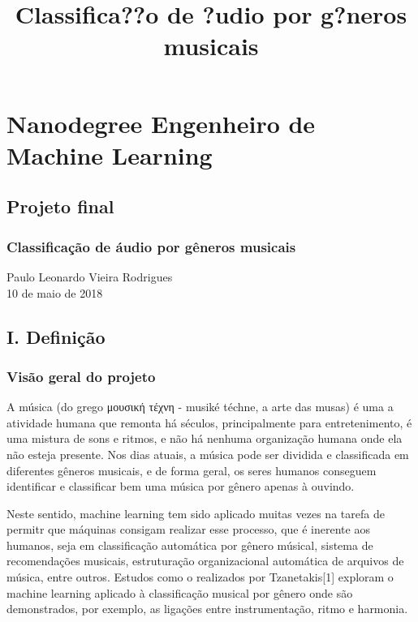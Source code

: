 \documentclass[11pt]{article}
\title{Classifica??o de ?udio por g?neros musicais}
\begin{document}
    
    
    \maketitle
    
    

    
    \section{Nanodegree Engenheiro de Machine
Learning}\label{nanodegree-engenheiro-de-machine-learning}

\subsection{Projeto final}\label{projeto-final}

\subsubsection{Classificação de áudio por gêneros
musicais}\label{classificauxe7uxe3o-de-uxe1udio-por-guxeaneros-musicais}

Paulo Leonardo Vieira Rodrigues\\
10 de maio de 2018

    \subsection{I. Definição}\label{i.-definiuxe7uxe3o}

\subsubsection{Visão geral do projeto}\label{visuxe3o-geral-do-projeto}

A música (do grego μουσική τέχνη - musiké téchne, a arte das musas) é
uma a atividade humana que remonta há séculos, principalmente para
entretenimento, é uma mistura de sons e ritmos, e não há nenhuma
organização humana onde ela não esteja presente. Nos dias atuais, a
música pode ser dividida e classificada em diferentes gêneros musicais,
e de forma geral, os seres humanos conseguem identificar e classificar
bem uma música por gênero apenas à ouvindo.

Neste sentido, machine learning tem sido aplicado muitas vezes na tarefa
de permitr que máquinas consigam realizar esse processo, que é inerente
aos humanos, seja em classificação automática por gênero músical,
sistema de recomendações musicais, estruturação organizacional
automática de arquivos de música, entre outros. Estudos como o
realizados por Tzanetakis{[}1{]} exploram o machine learning aplicado à
classificação musical por gênero onde são demonstrados, por exemplo, as
ligações entre instrumentação, ritmo e harmonia.
\end{document}
